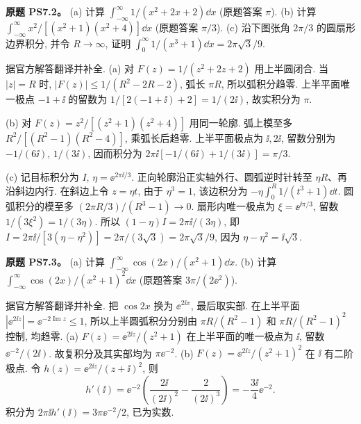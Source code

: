 \begin{exercise}
\textbf{原题 PS7.2。}\label{ass:ps7-2}
(a) 计算 $\int_{-\infty}^{\infty}1/(x^2+2x+2)\dd x$ (原题答案 $\pi$).
(b) 计算 $\int_{-\infty}^{\infty}x^2/[(x^2+1)(x^2+4)]\dd x$ (原题答案 $\pi/3$).
(c) 沿下图张角 $2\pi/3$ 的圆扇形边界积分, 并令 $R\to\infty$, 证明 $\int_0^\infty1/(x^3+1)\dd x=2\pi\sqrt3/9$.
\begin{center}
\end{center}
\end{exercise}
\begin{solution}
据官方解答翻译并补全.
(a) 对 $F(z)=1/(z^2+2z+2)$ 用上半圆闭合. 当 $|z|=R$ 时, $|F(z)|\le1/(R^2-2R-2)$, 弧长 $\pi R$, 所以弧积分趋零. 上半平面唯一极点 $-1+\ii$ 的留数为 $1/[2(-1+\ii)+2]=1/(2\ii)$, 故实积分为 $\pi$.

(b) 对 $F(z)=z^2/[(z^2+1)(z^2+4)]$ 用同一轮廓. 弧上模至多 $R^2/[(R^2-1)(R^2-4)]$, 乘弧长后趋零. 上半平面极点为 $\ii,2\ii$, 留数分别为 $-1/(6\ii)$, $1/(3\ii)$, 因而积分为 $2\pi\ii[-1/(6\ii)+1/(3\ii)]=\pi/3$.

(c) 记目标积分为 $I$, $\eta=\ee^{2\pi\ii/3}$. 正向轮廓沿正实轴外行、圆弧逆时针转至 $\eta R$、再沿斜边内行. 在斜边上令 $z=\eta t$, 由于 $\eta^3=1$, 该边积分为 $-\eta\int_0^R1/(t^3+1)\dd t$. 圆弧积分的模至多 $(2\pi R/3)/(R^3-1)\to0$. 扇形内唯一极点为 $\xi=\ee^{\ii\pi/3}$, 留数 $1/(3\xi^2)=1/(3\eta)$.
所以 $(1-\eta)I=2\pi\ii/(3\eta)$, 即
$I=2\pi\ii/[3(\eta-\eta^2)]=2\pi/(3\sqrt3)=2\pi\sqrt3/9$, 因为 $\eta-\eta^2=\ii\sqrt3$.
\end{solution}

\begin{exercise}
\textbf{原题 PS7.3。}\label{ass:ps7-3}
(a) 计算 $\int_{-\infty}^{\infty}\cos(2x)/(x^2+1)\dd x$.
(b) 计算 $\int_{-\infty}^{\infty}\cos(2x)/(x^2+1)^2\dd x$ (原题答案 $3\pi/(2\ee^2)$).
\end{exercise}
\begin{solution}
据官方解答翻译并补全. 把 $\cos2x$ 换为 $\ee^{2\ii x}$, 最后取实部. 在上半平面 $|\ee^{2\ii z}|=\ee^{-2\operatorname{Im}z}\le1$, 所以上半圆弧积分分别由 $\pi R/(R^2-1)$ 和 $\pi R/(R^2-1)^2$ 控制, 均趋零.
(a) $F(z)=\ee^{2\ii z}/(z^2+1)$ 在上半平面的唯一极点为 $\ii$, 留数 $\ee^{-2}/(2\ii)$. 故复积分及其实部均为 $\pi\ee^{-2}$.
(b) $F(z)=\ee^{2\ii z}/(z^2+1)^2$ 在 $\ii$ 有二阶极点. 令 $h(z)=\ee^{2\ii z}/(z+\ii)^2$, 则
\[
 h'(\ii)=\ee^{-2}\left(\frac{2\ii}{(2\ii)^2}-\frac2{(2\ii)^3}\right)
 =-\frac{3\ii}{4}\ee^{-2}.
\]
积分为 $2\pi\ii h'(\ii)=3\pi\ee^{-2}/2$, 已为实数.
\end{solution}

